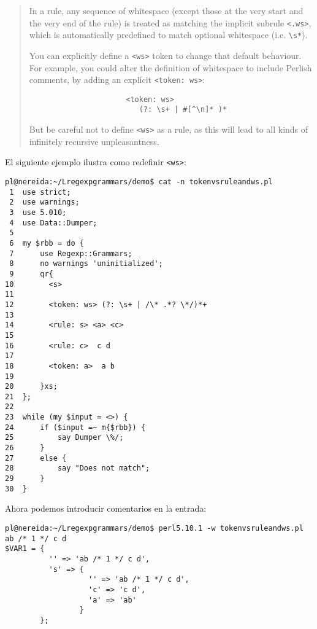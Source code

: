 \begin{it}\begin{quotation}
In a rule, any sequence of whitespace (except those at the very start
and the very end of the rule) is treated as matching the implicit subrule
\verb"<.ws>", which is automatically predefined to match optional whitespace 
(i.e. \verb"\s*").

You can explicitly define a \verb"<ws>" token to change that default
behaviour. For example, you could alter the definition of whitespace
to include Perlish comments, by adding an explicit \verb"<token: ws>":

\begin{verbatim}
                      <token: ws>
                         (?: \s+ | #[^\n]* )*
\end{verbatim}

But be careful not to define \verb"<ws>" as a rule, as this will lead
to all kinds of infinitely recursive unpleasantness.
\end{quotation}\end{it}
El siguiente ejemplo ilustra como redefinir \verb|<ws>|:
\begin{verbatim}
pl@nereida:~/Lregexpgrammars/demo$ cat -n tokenvsruleandws.pl
 1  use strict;
 2  use warnings;
 3  use 5.010;
 4  use Data::Dumper;
 5
 6  my $rbb = do {
 7      use Regexp::Grammars;
 8      no warnings 'uninitialized';
 9      qr{
10        <s>
11
12        <token: ws> (?: \s+ | /\* .*? \*/)*+
13
14        <rule: s> <a> <c>
15
16        <rule: c>  c d
17
18        <token: a>  a b
19
20      }xs;
21  };
22
23  while (my $input = <>) {
24      if ($input =~ m{$rbb}) {
25          say Dumper \%/;
26      }
27      else {
28          say "Does not match";
29      }
30  }
\end{verbatim}
Ahora podemos introducir comentarios en la entrada:
\begin{verbatim}
pl@nereida:~/Lregexpgrammars/demo$ perl5.10.1 -w tokenvsruleandws.pl
ab /* 1 */ c d
$VAR1 = {
          '' => 'ab /* 1 */ c d',
          's' => {
                   '' => 'ab /* 1 */ c d',
                   'c' => 'c d',
                   'a' => 'ab'
                 }
        };

\end{verbatim}


